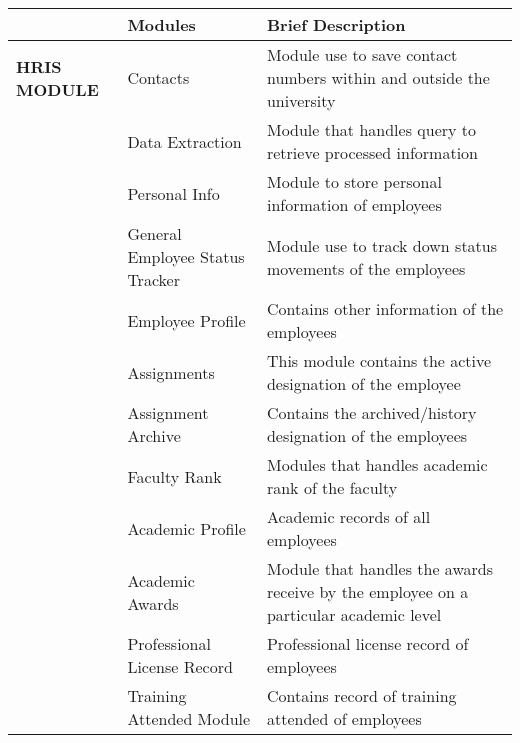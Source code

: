 \begin{table}[H]
    \begin{tabular}{@{}p{2cm}p{3.5cm}p{9cm}@{}}
    \toprule
    \multicolumn{1}{l}{} & \textbf{Modules}                         & \textbf{Brief Description}                                                            \\ \midrule
    \textbf{HRIS MODULE} & Contacts                                 & Module use to save contact numbers within and outside the university                  \\
                         & Data Extraction                          & Module that handles query to retrieve processed information                           \\
                         & Personal Info                            & Module to store personal information of employees                                     \\
                         & General Employee Status Tracker          & Module use to track down status movements of the employees                            \\
                         & Employee Profile                         & Contains other information of the employees                                           \\
                         & Assignments                              & This module contains the active designation of the employee                           \\
                         & Assignment Archive                       & Contains the archived/history designation of the employees                            \\
                         & Faculty Rank                             & Modules that handles academic rank of the faculty                                     \\
                         & Academic Profile                         & Academic records of all employees                                                     \\
                         & Academic Awards                          & Module that handles the awards receive by the employee on a particular academic level \\
                         & Professional License Record              & Professional license record of employees                                              \\
                         & Training Attended Module                 & Contains record of training attended of employees                                     \\

\end{tabular}
\end{table}
